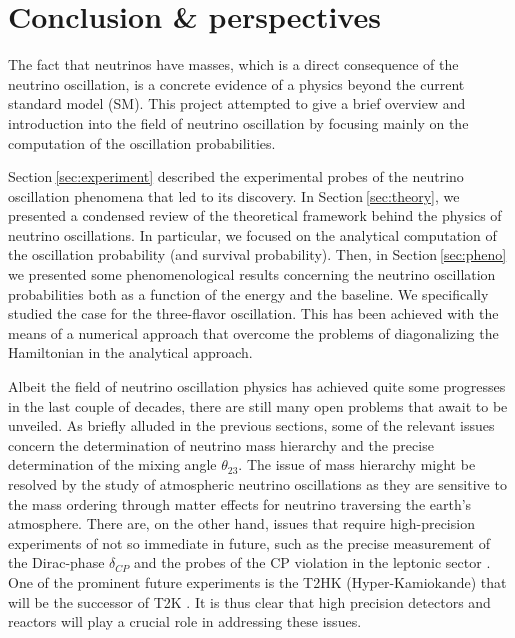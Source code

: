 \documentclass[twocolumn,secnumarabic,amssymb, nobibnotes, aps, prd,10pt]{revtex4-1}
\newcommand{\Sec}[1]{Section$\:$\ref{#1}}
\begin{document}
\section{Conclusion \& perspectives}
\label{sec:conclusion}

The fact that neutrinos have masses, which is a direct consequence of the neutrino oscillation,
is a concrete evidence of a physics beyond the current standard model (SM). This project attempted
to give a brief overview and introduction into the field of neutrino oscillation by focusing
mainly on the computation of the oscillation probabilities.

\Sec{sec:experiment} described the experimental probes of the neutrino oscillation phenomena that
led to its discovery. In \Sec{sec:theory}, we presented a condensed review of the theoretical 
framework behind the physics of neutrino oscillations. In particular, we focused on the analytical
computation of the oscillation probability (and survival probability). Then, in \Sec{sec:pheno} we 
presented some phenomenological results concerning the neutrino oscillation probabilities both as
a function of the energy and the baseline. We specifically studied the case for the three-flavor
oscillation. This has been achieved with the means of a numerical approach that overcome the problems
of diagonalizing the Hamiltonian in the analytical approach.

Albeit the field of neutrino oscillation physics has achieved quite some progresses in the last couple of 
decades, there are still many open problems that await to be unveiled. As briefly alluded in the
previous sections, some of the relevant issues concern the determination of neutrino mass 
hierarchy and the precise determination of the mixing angle $\theta_{23}$. The issue of mass
hierarchy might be resolved by the study of atmospheric neutrino oscillations as they are sensitive
to the mass ordering through matter effects for neutrino traversing the earth's atmosphere.
There are, on the other hand, issues that require high-precision experiments of not so immediate in future, such as the precise measurement of the Dirac-phase $\delta_{CP}$ and the probes of the CP violation in the leptonic sector \cite{Capozzi:2017ipn}. 
One of the prominent future experiments is the T2HK (Hyper-Kamiokande) that will be the successor of T2K \cite{Bellini:2013wra}. It is thus clear that high precision detectors
and reactors will play a crucial role in addressing these issues.



\end{document}
